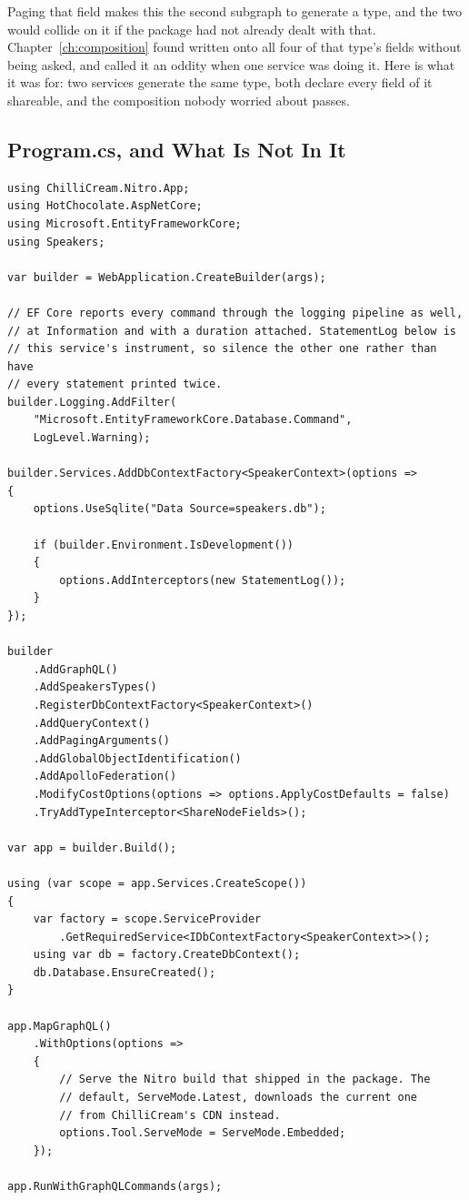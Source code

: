 %
Paging that field makes this the second subgraph to generate a 
type, and the two would collide on it if the package had not already dealt with
that. Chapter~\ref{ch:composition} found  written onto all four
of that type's fields without being asked, and called it an oddity when one
service was doing it. Here is what it was for: two services generate the same
type, both declare every field of it shareable, and the composition nobody
worried about passes.

\subsection{Program.cs, and What Is Not In It}

\begin{verbatim}
using ChilliCream.Nitro.App;
using HotChocolate.AspNetCore;
using Microsoft.EntityFrameworkCore;
using Speakers;

var builder = WebApplication.CreateBuilder(args);

// EF Core reports every command through the logging pipeline as well,
// at Information and with a duration attached. StatementLog below is
// this service's instrument, so silence the other one rather than have
// every statement printed twice.
builder.Logging.AddFilter(
    "Microsoft.EntityFrameworkCore.Database.Command",
    LogLevel.Warning);

builder.Services.AddDbContextFactory<SpeakerContext>(options =>
{
    options.UseSqlite("Data Source=speakers.db");

    if (builder.Environment.IsDevelopment())
    {
        options.AddInterceptors(new StatementLog());
    }
});

builder
    .AddGraphQL()
    .AddSpeakersTypes()
    .RegisterDbContextFactory<SpeakerContext>()
    .AddQueryContext()
    .AddPagingArguments()
    .AddGlobalObjectIdentification()
    .AddApolloFederation()
    .ModifyCostOptions(options => options.ApplyCostDefaults = false)
    .TryAddTypeInterceptor<ShareNodeFields>();

var app = builder.Build();

using (var scope = app.Services.CreateScope())
{
    var factory = scope.ServiceProvider
        .GetRequiredService<IDbContextFactory<SpeakerContext>>();
    using var db = factory.CreateDbContext();
    db.Database.EnsureCreated();
}

app.MapGraphQL()
    .WithOptions(options =>
    {
        // Serve the Nitro build that shipped in the package. The
        // default, ServeMode.Latest, downloads the current one
        // from ChilliCream's CDN instead.
        options.Tool.ServeMode = ServeMode.Embedded;
    });

app.RunWithGraphQLCommands(args);
\end{verbatim}

